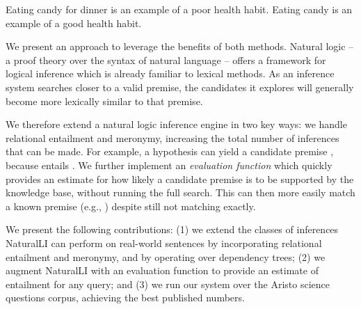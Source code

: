 \entailmentExample
{Eating candy for dinner is an example of a poor health habit.}
{Eating candy is an example of a good health habit.}

We present an approach to leverage the benefits of both methods.
Natural logic -- a proof theory over the syntax of natural language --
  offers a framework for logical inference which is already
  familiar to lexical methods.
As an inference system searches closer to a valid premise,
  the candidates it explores will generally become more lexically similar
  to that premise.

We therefore extend a natural logic inference engine in two key ways:
  we handle relational entailment 
  and meronymy, increasing the total number of inferences that can be made.
  For example, a hypothesis  can yield
  a candidate premise , because 
  entails .
We further implement an \textit{evaluation function} which quickly
  provides an estimate for how likely a candidate premise is to be supported
  by the knowledge base, without running the full search.
This can then more easily match a known premise 
  (e.g., ) 
  despite still not matching exactly.

We present the following contributions:
(1) we extend the classes of inferences NaturalLI can perform on real-world 
    sentences by
    incorporating relational entailment and meronymy, and by operating over 
    dependency trees;
(2) we augment NaturalLI with an evaluation function to provide an estimate of entailment
    for any query; and 
(3) we run our system over the Aristo science questions corpus,
    achieving the best published numbers.


